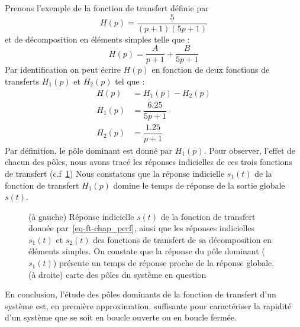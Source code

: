 Prenons l'exemple de la fonction de transfert définie par  
\begin{equation}
H(p)=\dfrac{5}{(p+1)(5p+1)}\label{eq-ft-chap_perf}
\end{equation}
et de décomposition en éléments simples telle que :
\[
H(p)=\dfrac{A}{p+1}+\dfrac{B}{5p+1}
\]
\newpage
\restoregeometry
\captionsetup{width=0.9\linewidth}
Par identification on peut écrire $H(p)$ en fonction de
deux fonctions de transferts $H_1(p)$ et $H_2(p)$ tel que :
\begin{align*}
	H(p)&=H_1(p)-H_2(p)\\
	H_1(p)&=\dfrac{6.25}{5p+1}\\
	H_2(p)&=\dfrac{1.25}{p+1}
\end{align*}
Par définition, le pôle dominant est donné par $H_1(p)$.
Pour observer, l'effet de chacun des pôles, nous avons tracé 
les réponses indicielles de ces trois fonctions de transfert
(c.f~\cref{fig-poles_dominants})
Nous constatons que la réponse indicielle $s_1(t)$ de la fonction
de transfert $H_1(p)$ domine le temps de réponse de la sortie
globale $s(t)$.
\begin{figure}[!h]
    \centering
    
    \caption{(à gauche) Réponse indicielle $s(t)$ de la fonction de 
             transfert donnée par~\cref{eq-ft-chap_perf}, ainsi que les 
             réponses indicielles $s_1(t)$ et $s_2(t)$ des fonctions de 
             transfert de sa décomposition en éléments simples. 
             On constate que la réponse du pôle dominant ($s_1(t)$) 
             présente un temps de réponse proche de la réponse globale. 
             (à droite) carte des pôles du système en question
             \label{fig-poles_dominants}}
\end{figure}
En conclusion, l'étude des pôles dominants de la fonction de transfert 
d'un système est, en première approximation, suffisante pour caractériser 
la rapidité d'un système que se soit en boucle ouverte ou en boucle fermée.
\clearpage
